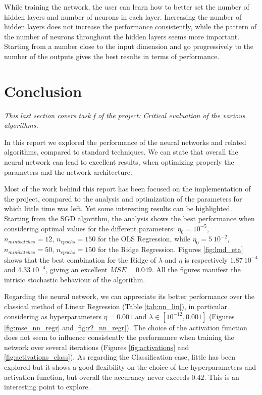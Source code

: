 \documentclass[english,notitlepage,reprint,nofootinbib]{revtex4-1}  %
\begin{document}
While training the network, the user can learn how to better set the number of hidden layers and number of neurons in each layer. Increasing the number of hidden layers does not increase the performance consistently, while the pattern of the number of neurons throughout the hidden layers seems more important. Starting from a number close to the input dimension and go progressively to the number of the outputs gives the best results in terms of performance.





\section{Conclusion}\label{sec:conclusion}

\textit{This last section covers task f of the project: Critical evaluation of the various algorithms.}

In this report we explored the performance of the neural networks and related algorithms, compared to standard techniques. We can state that overall the neural network can lead to excellent results, when optimizing properly the parameters and the network architecture. 

Most of the work behind this report has been focused on the implementation of the project, compared to the analysis and optimization of the parameters for which little time was left. Yet some interesting results can be highlighted. Starting from the SGD algorithm, the analysis shows the best performance when considering optimal values for the different parameters: $\eta_0=10^{-5}$, $n_{minibatches} = 12$, $n_{epochs} = 150$ for the OLS Regression, while $\eta_0=5 \ 10^{-2}$, $n_{minibatches} = 50$, $n_{epochs} = 150$ for the Ridge Regression. Figures \ref{fig:lmd_eta} shows that the best combination for the Ridge of $\lambda$ and $\eta$ is respectively $1.87\ 10^{-4}$ and $4.33 \ 10^{-4}$, giving an excellent $MSE=0.049$. All the figures manifest the intrisic stochastic behaviour of the algorithm.

Regarding the neural network, we can appreciate its better performance over the classical method of Linear Regression (Table \ref{tab:nn_lin}), in particular considering as hyperparameters $\eta=0.001$ and $\lambda \in [10^{-12},0.001]$ (Figures \ref{fig:mse_nn_regr} and \ref{fig:r2_nn_regr}). The choice of the activation function does not seem to influence consistently the performance when training the network over several iterations (Figures \ref{fig:activations} and \ref{fig:activations_class}). As regarding the Classification case, little has been explored but it shows a good flexibility on the choice of the hyperparameters and activation function, but overall the accurancy never exceeds $0.42$. This is an interesting point to explore.
\end{document}
